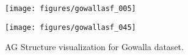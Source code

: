 \documentclass{USC-Thesis}
\numberwithin{equation}{chapter}
\begin{document}
\begin{comment}
\begin{figure*}[tbh]
	\begin{minipage}[b]{0.195\linewidth}
	\centering
		\texttt{[image: exps/ye\_li\_100\_anw\_a2]}
		\subcaption{$\mathit{ANW}$, Ye.-Linear}
		\label{fig:ye_li_100_anw_a2}
	\end{minipage}
	\begin{minipage}[b]{0.195\linewidth}
	\centering
		\texttt{[image: exps/ye\_li\_100\_hop\_a2]}
		\subcaption{$\mathit{HOP}$, Ye.-Linear}
		\label{fig:ye_li_100_hop_a2}
	\end{minipage}
	\begin{minipage}[b]{0.195\linewidth}
	\centering
		\texttt{[image: exps/ye\_li\_100\_wtd\_a2]}
		\subcaption{$\mathit{WTD}$, Ye.-Linear}
		\label{fig:ye_li_100_atd_a2}
	\end{minipage}	
	\begin{minipage}[b]{0.195\linewidth}
		\centering
		\texttt{[image: exps/ye\_li\_100\_asr\_a2]}
		\subcaption{$\mathit{ASR}$, Ye.-Linear}
		\label{fig:ye_li_100_asr_a2}
	\end{minipage}
		\begin{minipage}[b]{0.195\linewidth}
		\centering
		\texttt{[image: exps/ye\_li\_100\_cell\_a2]}
		\subcaption{$\mathit{CELL}$, Ye.-Linear}
		\label{fig:ye_li_100_cell_a2}
	\end{minipage}
	\caption{Overhead of privacy compared to non-private algorithm when the number of workers linearly decreases. BasicD and Kalman are not shown for clarity. (f=0.1)}
\label{fig:privacy_cost_a2}
\end{figure*}

\end{comment}


\begin{figure}[tbh]
	\begin{minipage}[b]{0.49\linewidth}
	\centering
		\texttt{[image: figures/gowallasf\_005]}
		\label{fig:gowallasf_005}
	\end{minipage}
	\begin{minipage}[b]{0.49\linewidth}
	\centering
		\texttt{[image: figures/gowallasf\_045]}
		\label{fig:gowallasf_045}
	\end{minipage}
	\caption{AG Structure visualization for Gowalla dataset.}
\label{fig:gowallasf_gs}
\end{figure}
\end{document}
